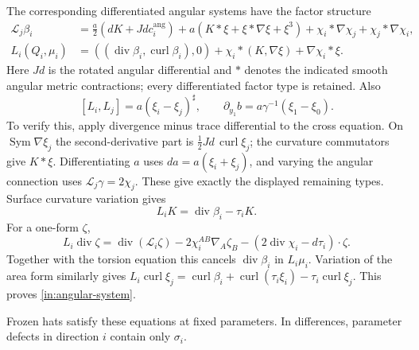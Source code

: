The corresponding differentiated angular systems have the factor structure
\begin{equation}\label{in:angular-system}
\begin{aligned}
 \mathscr L_j\beta_i
   &={}\tfrac a2(dK+Jd c_i^{\mathrm{ang}})
      +a(K*\xi+\xi*\nabla\xi+\xi^3)
      +\chi_i*\nabla\chi_j+\chi_j*\nabla\chi_i,\\
 L_i(Q_i,\mu_i)
   &={}((\operatorname{div}\beta_i,
                       \operatorname{curl}\beta_i),0)
      +\chi_i*(K,\nabla\xi)+\nabla\chi_i*\xi.
\end{aligned}
\end{equation}
Here $Jd$ is the rotated angular differential and $*$ denotes the
indicated smooth angular metric contractions; every differentiated
factor type is retained. Also
\begin{equation}\label{in:bracket-shift}
 [L_i,L_j]=a(\xi_i-\xi_j)^\sharp,\qquad
 \partial_{y_1}b=a\gamma^{-1}(\xi_1-\xi_0).
\end{equation}
To verify this, apply divergence minus trace differential to the cross
equation.  On $\operatorname{Sym}\nabla\xi_j$ the second-derivative
part is $\tfrac12Jd\,\operatorname{curl}\xi_j$; the curvature
commutators give $K*\xi$.  Differentiating $a$ uses
$da=a(\xi_i+\xi_j)$, and varying the angular connection uses
$\mathscr L_j\gamma=2\chi_j$.  These give exactly the displayed remaining
types.  Surface curvature variation gives
\begin{equation}\label{in:curvature-variation}
 L_iK=\operatorname{div}\beta_i-\tau_iK .
\end{equation}
For a one-form $\zeta$,
\[
 L_i\operatorname{div}\zeta
 =\operatorname{div}(\mathscr L_i\zeta)
   -2\chi_i^{AB}\nabla_A\zeta_B
   -(2\operatorname{div}\chi_i-d\tau_i)\cdot\zeta .
\]
Together with the torsion equation this cancels
$\operatorname{div}\beta_i$ in $L_i\mu_i$.  Variation of the area form
similarly gives
$L_i\operatorname{curl}\xi_j
 =\operatorname{curl}\beta_i+
   \operatorname{curl}(\tau_i\xi_i)-\tau_i\operatorname{curl}\xi_j$.
This proves \eqref{in:angular-system}.


Frozen hats satisfy these equations at fixed parameters. In differences,
parameter defects in direction $i$ contain only $\sigma_i$.

